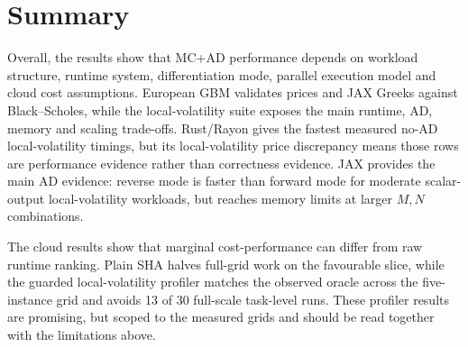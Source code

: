\section{Summary}
\label{sec:results-summary}

Overall, the results show that MC+AD performance depends on workload structure,
runtime system, differentiation mode, parallel execution model and cloud cost
assumptions. European GBM validates prices and JAX Greeks against
Black--Scholes, while the local-volatility suite exposes the main runtime, AD,
memory and scaling trade-offs. Rust/Rayon gives the fastest measured no-AD
local-volatility timings, but its local-volatility price discrepancy means those
rows are performance evidence rather than correctness evidence. JAX provides the
main AD evidence: reverse mode is faster than forward mode for moderate
scalar-output local-volatility workloads, but reaches memory limits at larger
\(M,N\) combinations.

The cloud results show that marginal cost-performance can differ from raw
runtime ranking. Plain SHA halves full-grid work on the favourable
 slice, while the guarded local-volatility profiler matches
the observed oracle across the five-instance grid and avoids 13 of 30
full-scale task-level runs. These profiler results are promising, but scoped to
the measured grids and should be read together with the limitations above.
